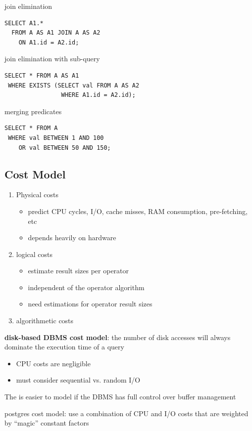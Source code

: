 \documentclass[11pt]{article}
\begin{document}
join elimination
\begin{verbatim}
SELECT A1.*
  FROM A AS A1 JOIN A AS A2
    ON A1.id = A2.id;
\end{verbatim}

join elimination with sub-query
\begin{verbatim}
SELECT * FROM A AS A1
 WHERE EXISTS (SELECT val FROM A AS A2
                WHERE A1.id = A2.id);
\end{verbatim}

merging predicates
\begin{verbatim}
SELECT * FROM A
 WHERE val BETWEEN 1 AND 100
    OR val BETWEEN 50 AND 150;
\end{verbatim}
\subsection{Cost Model}
\label{sec:org663e2e9}
\begin{enumerate}
\item Physical costs
\begin{itemize}
\item predict CPU cycles, I/O, cache misses, RAM consumption, pre-fetching, etc
\item depends heavily on hardware
\end{itemize}
\item logical costs
\begin{itemize}
\item estimate result sizes per operator
\item independent of the operator algorithm
\item need estimations for operator result sizes
\end{itemize}
\item algorithmetic costs
\end{enumerate}

\textbf{disk-based DBMS cost model}: the number of disk accesses will always dominate the execution time
 of a query
\begin{itemize}
\item CPU costs are negligible
\item must consider sequential vs. random I/O
\end{itemize}

The is easier to model if the DBMS has full control over buffer management

postgres cost model: use a combination of CPU and I/O costs that are weighted by ``magic''
constant factors
\end{document}
